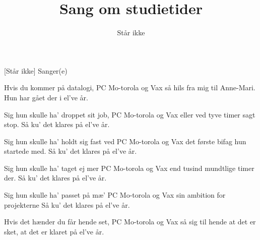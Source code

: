 \documentclass[a4paper,11pt]{article}
\title{Sang om studietider}
\author{Står ikke}
\begin{document}
\maketitle

\begin{roles}
[Står ikke] Sanger(e)
\end{roles}


\begin{song}
%
Hvis du kommer på datalogi,
PC Mo-torola og Vax
så hils fra mig til Anne-Mari.
Hun har gået der i el've år.

Sig hun skulle ha' droppet sit job,
PC Mo-torola og Vax
eller ved tyve timer sagt stop.
Så ku' det klares på el've år.

Sig hun skulle ha' holdt sig fast ved
PC Mo-torola og Vax
det første bifag hun startede med.
Så ku' det klares på el've år.

Sig hun skulle ha' taget ej mer
PC Mo-torola og Vax
end tusind mundtlige timer der.
Så ku' det klares på el've år.

Sig hun skulle ha' passet på mæ'
PC Mo-torola og Vax
sin ambition for projekterne
Så ku' det klares på el've år.

Hvis det hænder du får hende set,
PC Mo-torola og Vax
så sig til hende at det er sket,
at det er klaret på el've år.
\end{song}
\end{document}
